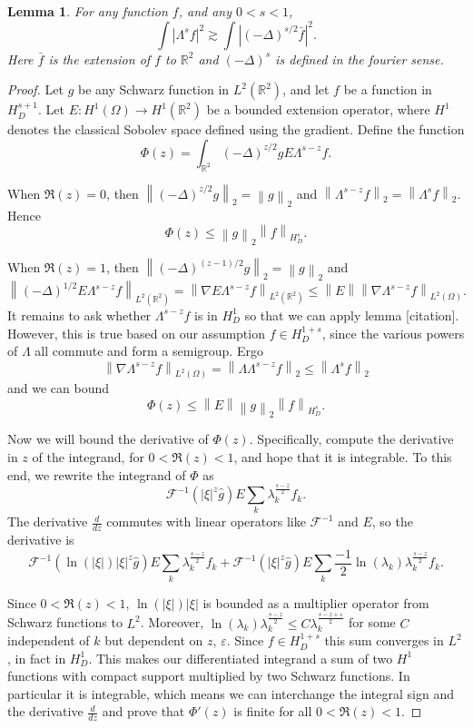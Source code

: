 \documentclass[11pt]{amsart}
\newtheorem{lemma}[theorem]{Lemma}
\theoremstyle{remark}
\theoremstyle{definition}
\newcommand{\R}{\mathbb{R}}
\newcommand{\Four}{\mathcal{F}}
\newcommand{\eps}{\varepsilon}
\newcommand{\norm}[1]{\left\lVert#1\right\rVert}
\newcommand{\paren}[1]{\left( #1 \right)}
\newcommand{\abs}[1]{\left\lvert #1 \right\rvert}
\newcommand{\grad}{\nabla}
\newcommand{\Laplace}{\Delta}
\newcommand{\ddz}{\frac{d}{dz}}
\newcommand{\n}{^{-1}}
\begin{document}
\begin{lemma} \label{thm:hadamard 3 lines}
For any function $f$, and any $0 < s < 1$,
\[ \int \abs{\Lambda^s f}^2 \gtrsim \int \abs{\paren{-\Laplace}^{s/2} \bar{f}}^2. \]
Here $\bar{f}$ is the extension of $f$ to $\R^2$ and $\paren{-\Laplace}^s$ is defined in the fourier sense.  
\end{lemma}

\begin{proof}
Let $g$ be any Schwarz function in $L^2(\R^2)$, and let $f$ be a function in $H^{s+1}_D$.  Let $E:H^1(\Omega) \to H^1(\R^2)$ be a bounded extension operator, where $H^1$ denotes the classical Sobolev space defined using the gradient.  Define the function
\[ \Phi(z) = \int_{\R^2} \paren{-\Laplace}^{z/2} g E \Lambda^{s-z} f. \]

When $\Re(z) = 0$, then $\norm{\paren{-\Laplace}^{z/2} g}_2 = \norm{g}_2$ and $\norm{\Lambda^{s-z} f}_2 = \norm{\Lambda^s f}_2$.  Hence
\[ \Phi(z) \leq \norm{g}_2 \norm{f}_{H^s_D}. \]

When $\Re(z)=1$, then $\norm{\paren{-\Laplace}^{(z-1)/2} g}_2 = \norm{g}_2$ and 
\[ \norm{\paren{-\Laplace}^{1/2} E\Lambda^{s-z} f}_{L^2(\R^2)} = \norm{\grad E \Lambda^{s-z} f}_{L^2(\R^2)} \leq \norm{E} \norm{\grad \Lambda^{s-z} f}_{L^2(\Omega)}. \]
It remains to ask whether $\Lambda^{s-z} f$ is in $H^1_D$ so that we can apply lemma [citation].  However, this is true based on our assumption $f \in H^{1+s}_D$, since the various powers of $\Lambda$ all commute and form a semigroup.  Ergo
\[ \norm{\grad \Lambda^{s-z} f}_{L^2(\Omega)} = \norm{\Lambda \Lambda^{s-z} f}_2 \leq \norm{\Lambda^s f}_2 \]
and we can bound
\[ \Phi(z) \leq \norm{E} \norm{g}_2 \norm{f}_{H^s_D}. \]

Now we will bound the derivative of $\Phi(z)$.  Specifically, compute the derivative in $z$ of the integrand, for $0<\Re(z)<1$, and hope that it is integrable.  To this end, we rewrite the integrand of $\Phi$ as
\[ \Four\n\paren{ |\xi|^z \hat{g} } E \sum_k \lambda_k^{\frac{s-z}{2}} f_k. \]
The derivative $\ddz$ commutes with linear operators like $\Four\n$ and $E$, so the derivative is
\[ \Four\n\paren{ \ln(|\xi|) |\xi|^z \hat{g} } E \sum_k \lambda_k^{\frac{s-z}{2}} f_k + \Four\n\paren{ |\xi|^z \hat{g} } E \sum_k \frac{-1}{2} \ln(\lambda_k) \lambda_k^{\frac{s-z}{2}} f_k. \]

Since $0<\Re(z)<1$, $\ln(|\xi|)|\xi|$ is bounded as a multiplier operator from Schwarz functions to $L^2$.  Moreover, $\ln(\lambda_k) \lambda_k^{\frac{s-z}{2}} \leq C \lambda_k^{\frac{s-z+\eps}{2}}$ for some $C$ independent of $k$ but dependent on $z$, $\eps$.  Since $f \in H^{1+s}_D$ this sum converges in $L^2$, in fact in $H_D^1$.  This makes our differentiated integrand a sum of two $H^1$ functions with compact support multiplied by two Schwarz functions.  In particular it is integrable, which means we can interchange the integral sign and the derivative $\ddz$ and prove that $\Phi'(z)$ is finite for all $0<\Re(z)<1$. 


\end{proof}
\end{document}

